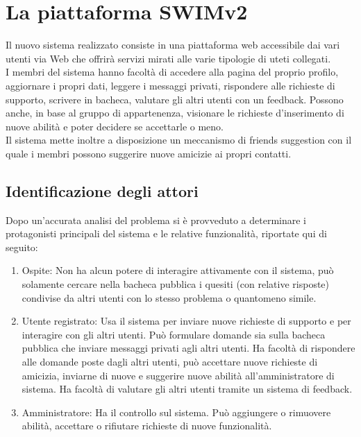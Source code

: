 \documentclass[a4paper,12pt]{article}
\begin{document}
\clearpage

\section{La piattaforma SWIMv2}
Il nuovo sistema realizzato consiste in una piattaforma web accessibile dai vari utenti via Web che offrirà servizi mirati alle varie tipologie di uteti collegati. \\
I membri del sistema hanno facoltà di accedere alla pagina del proprio profilo, aggiornare i propri dati, leggere i messaggi privati, rispondere alle richieste di supporto, scrivere in bacheca, valutare gli altri utenti con un feedback. Possono anche, in base al gruppo di appartenenza, visionare le richieste d’inserimento di nuove abilità e poter decidere se accettarle o meno. \\
Il sistema mette inoltre a disposizione un meccanismo di friends suggestion con il quale i membri possono suggerire nuove amicizie ai propri contatti.
\subsection{Identificazione degli attori}
Dopo un’accurata analisi del problema si è provveduto a determinare i protagonisti principali del sistema e le relative funzionalità, riportate qui di seguito:
\begin{enumerate}
\item Ospite: Non ha alcun potere di interagire attivamente con il sistema, può solamente cercare nella bacheca pubblica i quesiti (con relative risposte) condivise da altri utenti con lo stesso problema o quantomeno simile.
\item Utente registrato: Usa il sistema per inviare nuove richieste di supporto e per interagire con gli altri utenti. Può formulare domande sia sulla bacheca pubblica che inviare messaggi privati agli altri utenti. Ha facoltà di rispondere alle domande poste dagli altri utenti, può accettare nuove richieste di amicizia, inviarne di nuove e suggerire nuove abilità all’amministratore di sistema. Ha facoltà di valutare gli altri utenti tramite un sistema di feedback.
\item Amministratore: Ha il controllo sul sistema. Può aggiungere o rimuovere abilità, accettare o rifiutare richieste di nuove funzionalità.
\end{enumerate}

\clearpage
\end{document}
